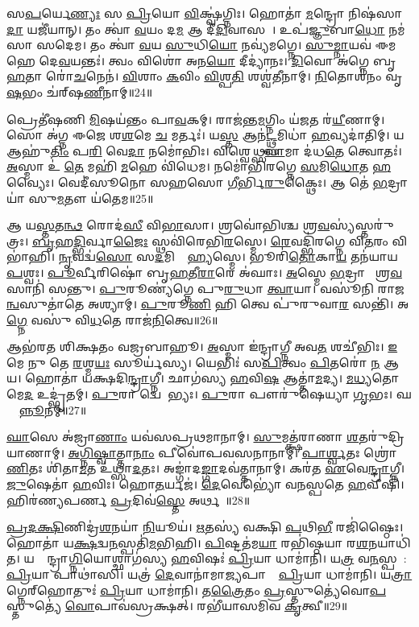 𑌸\ul{𑌪}𑌰𑍍𑌯𑍇\ul{𑌣𑍍𑌯𑌃} 𑌸 \ul{𑌪𑍍𑌰𑌿}𑌯𑍋 \ul{𑌵𑌿}𑌕𑍍𑌷𑍍𑌵॑𑌗𑍍𑌨𑌿𑌃।
𑌹𑍋𑌤𑌾॑ \ul{𑌮}𑌨𑍍𑌦𑍍𑌰𑍋 𑌨𑌿𑌷॑𑌸𑌾\ul{𑌦𑌾} 𑌯𑌜𑍀॑𑌯𑌾𑌨𑍍।
𑌤𑌂 𑌤𑍍𑌵𑌾॑ \ul{𑌵}𑌯𑌂 𑌦\ul{𑌮} 𑌆 𑌦𑍀॑\ul{𑌦𑌿}𑌵𑌾𑌸𑌮𑍍᳚।
𑌉𑌪॑\ul{𑌜𑍍𑌞𑍁}𑌬𑌾\ul{𑌧𑍋} 𑌨𑌮॑𑌸𑌾 𑌸𑌦𑍇𑌮।
𑌤𑌂 𑌤𑍍𑌵𑌾॑ \ul{𑌵}𑌯 \ul{𑌸𑍁}𑌧𑌿\ul{𑌯𑍋} 𑌨𑌵𑍍𑌯॑𑌮𑌗𑍍𑌨𑍇।
\ul{𑌸𑍁}\ul{𑌮𑍍𑌨𑌾}𑌯𑌵॑ 𑌈𑌮𑌹𑍇 𑌦𑍇\ul{𑌵}𑌯𑌨𑍍𑌤𑌃॑।
𑌤𑍍𑌵𑌂 𑌵𑌿𑌶𑍋॑ 𑌅𑌨\ul{𑌯𑍋} 𑌦𑍀𑌦𑍍𑌯𑌾॑𑌨𑌃।
\ul{𑌦𑌿}𑌵𑍋 𑌅॑𑌗𑍍𑌨𑍇 𑌬𑍃\ul{𑌹}𑌤𑌾 𑌰𑍋॑\ul{𑌚}𑌨𑍇𑌨॑।
\ul{𑌵𑌿}𑌶𑌾𑌂 \ul{𑌕}𑌵𑌿𑌂 \ul{𑌵𑌿}𑌶𑍍𑌪\ul{𑌤𑌿}\ul{} 𑌶𑌶𑍍𑌵॑𑌤𑍀𑌨𑌾𑌮𑍍।
\ul{𑌨𑌿}𑌤𑍋𑌶॑𑌨𑌂 𑌵𑍃\ul{𑌷}𑌭𑌂 𑌚॑𑌰𑍍‌\mbox{}𑌷\ul{𑌣𑍀}𑌨𑌾𑌮𑍍॥24॥

𑌪𑍍𑌰𑍇𑌤𑍀॑𑌷𑌣𑌿 \ul{𑌮𑌿}𑌷𑌯॑𑌨𑍍𑌤𑌂 𑌪𑌾\ul{𑌵}𑌕𑌮𑍍।
𑌰𑌾𑌜॑𑌨𑍍𑌤\ul{𑌮}𑌗𑍍𑌨𑌿𑌂 𑌯॑\ul{𑌜}𑌤 𑌰॑\ul{𑌯𑍀}𑌣𑌾𑌮𑍍।
𑌸𑍋 𑌅॑𑌗𑍍𑌨 𑌈𑌜𑍇 𑌶\ul{𑌶}𑌮𑍇 \ul{𑌚} 𑌮𑌰𑍍𑌤𑌃॑।
𑌯\ul{𑌸𑍍𑌤} 𑌆𑌨॑\ul{𑌟𑍍𑌥𑍍𑌸}𑌮𑌿𑌧𑌾॑ \ul{𑌹}𑌵𑍍𑌯𑌦𑌾॑𑌤𑌿𑌮𑍍।
𑌯 𑌆𑌹𑍁॑\ul{𑌤𑌿𑌂} 𑌪\ul{𑌰𑌿} 𑌵𑍇\ul{𑌦𑌾} 𑌨𑌮𑍋॑𑌭𑌿𑌃।
𑌵𑌿𑌶𑍍𑌵𑍇𑌥𑍍𑌸\ul{𑌵𑌾}𑌮𑌾 𑌦॑𑌧\ul{𑌤𑍇} 𑌤𑍍𑌵𑍋𑌤𑌃॑।
\ul{𑌅}𑌸𑍍𑌮𑌾 𑌉॑ \ul{𑌤𑍇} 𑌮𑌹𑌿॑ \ul{𑌮}𑌹𑍇 𑌵𑌿॑𑌧𑍇𑌮।
𑌨𑌮𑍋॑𑌭𑌿𑌰𑌗𑍍𑌨𑍇 \ul{𑌸}𑌮𑌿\ul{𑌧𑍋}𑌤 \ul{𑌹}𑌵𑍍𑌯𑍈𑌃।
𑌵𑍇𑌦𑍀॑𑌸𑍂𑌨𑍋 𑌸𑌹𑌸𑍋 \ul{𑌗𑍀}𑌰𑍍𑌭𑌿\ul{𑌰𑍁}𑌕𑍍𑌥𑍈𑌃।
𑌆 𑌤𑍇॑ \ul{𑌭}𑌦𑍍𑌰𑌾𑌯𑌾॑ 𑌸𑍁\ul{𑌮}𑌤𑍗 𑌯॑𑌤𑍇𑌮॥25॥

𑌆 𑌯\ul{𑌸𑍍𑌤}𑌤\ul{𑌨𑍍𑌥} 𑌰𑍋𑌦॑\ul{𑌸𑍀} 𑌵𑌿\ul{𑌭𑌾}𑌸𑌾।
𑌶𑍍𑌰𑌵𑍋॑𑌭𑌿𑌶𑍍𑌚 𑌶𑍍𑌰\ul{𑌵}𑌸𑍍𑌯॑𑌸𑍍𑌤𑌰𑍁॑𑌤𑍍𑌰𑌃।
\ul{𑌬𑍃}𑌹\ul{𑌦𑍍𑌭𑌿}𑌰𑍍𑌵𑌾\ul{𑌜𑍈𑌃} 𑌸𑍍𑌥𑌵𑌿॑𑌰𑍇𑌭𑌿\ul{𑌰}𑌸𑍍𑌮𑍇।
\ul{𑌰𑍇}𑌵𑌦𑍍𑌭𑌿॑𑌰𑌗𑍍𑌨𑍇 𑌵𑌿\ul{𑌤}𑌰𑌂 𑌵𑌿 𑌭𑌾॑𑌹𑌿।
\ul{𑌨𑍃}𑌵𑌦𑍍𑌵॑\ul{𑌸𑍋} 𑌸\ul{𑌦}𑌮𑌿𑌦𑍍𑌧𑍇᳚\ul{𑌹𑍍𑌯}𑌸𑍍𑌮𑍇।
𑌭𑍂𑌰𑌿॑\ul{𑌤𑍋}𑌕𑌾\ul{𑌯} 𑌤𑌨॑𑌯𑌾𑌯 \ul{𑌪}𑌶𑍍𑌵𑌃।
\ul{𑌪𑍂}𑌰𑍍𑌵𑍀𑌰𑌿𑌷𑍋॑ 𑌬𑍃\ul{𑌹}𑌤𑍀\ul{𑌰𑌾}𑌰𑍇 𑌅॑𑌘𑌾𑌃।
\ul{𑌅}𑌸𑍍𑌮𑍇 \ul{𑌭}𑌦𑍍𑌰𑌾 𑌸𑍗᳚𑌶𑍍𑌰\ul{𑌵}𑌸𑌾𑌨𑌿॑ 𑌸𑌨𑍍𑌤𑍁।
\ul{𑌪𑍁}𑌰𑍂𑌣𑍍𑌯॑𑌗𑍍𑌨𑍇 𑌪𑍁\ul{𑌰𑍁}𑌧𑌾 \ul{𑌤𑍍𑌵𑌾}𑌯𑌾।
𑌵𑌸𑍂॑𑌨𑌿 𑌰𑌾𑌜\ul{𑌨𑍍𑌵}𑌸𑍁𑌤𑌾॑𑌤𑍇 𑌅𑌶𑍍𑌯𑌾𑌮𑍍।
\ul{𑌪𑍁}𑌰𑍂\ul{𑌣𑌿} 𑌹𑌿 𑌤𑍍𑌵𑍇 𑌪𑍁॑𑌰𑍁𑌵𑌾\ul{𑌰} 𑌸𑌨𑍍𑌤𑌿॑।
𑌅\ul{𑌗𑍍𑌨𑍇} 𑌵𑌸𑍁॑ 𑌵𑌿\ul{𑌧}𑌤𑍇 𑌰𑌾𑌜॑\ul{𑌨𑌿}𑌤𑍍𑌵𑍇॥26॥

𑌆𑌭॑𑌰𑌤 𑌶𑌿𑌕𑍍𑌷𑌤𑌂 𑌵𑌜𑍍𑌰𑌬𑌾𑌹𑍂।
\ul{𑌅}𑌸𑍍𑌮𑌾 𑌇॑𑌨𑍍𑌦𑍍𑌰𑌾𑌗𑍍𑌨𑍀 𑌅𑌵\ul{𑌤}\ul{} 𑌶𑌚𑍀॑𑌭𑌿𑌃।
\ul{𑌇}𑌮𑍇 𑌨𑍁 𑌤𑍇 \ul{𑌰}𑌶𑍍𑌮\ul{𑌯𑌃} 𑌸𑍂𑌰𑍍𑌯॑𑌸𑍍𑌯।
𑌯𑍇𑌭𑌿𑌃॑ 𑌸\ul{𑌪𑌿}𑌤𑍍𑌵𑌂 \ul{𑌪𑌿}𑌤𑌰𑍋॑ \ul{𑌨} 𑌆𑌯\sn{}।
𑌹𑍋𑌤𑌾॑ 𑌯𑌕𑍍𑌷𑌦𑌿\ul{𑌨𑍍𑌦𑍍𑌰𑌾}𑌗𑍍𑌨𑍀।
𑌛𑌾𑌗॑𑌸𑍍𑌯 \ul{𑌹}𑌵𑌿\ul{𑌷} 𑌆𑌤𑍍𑌤𑌾॑\ul{𑌮}𑌦𑍍𑌯।
\ul{𑌮}\ul{𑌧𑍍𑌯}𑌤𑍋 𑌮𑍇\ul{𑌦} 𑌉𑌦𑍍𑌭𑍃॑𑌤𑌮𑍍।
\ul{𑌪𑍁}𑌰𑌾 𑌦𑍍𑌵𑍇𑌷𑍋᳚𑌭𑍍𑌯𑌃।
\ul{𑌪𑍁}𑌰𑌾 𑌪𑍗𑌰𑍁॑𑌷𑍇𑌯𑍍𑌯𑌾 \ul{𑌗𑍃}𑌭𑌃।
𑌘𑌸𑍍𑌤𑌾᳚\ul{𑌨𑍍𑌨𑍂}𑌨𑌮𑍍॥27॥

\ul{𑌘𑌾}𑌸𑍇 𑌅॑𑌜𑍍𑌰𑌾\ul{𑌣𑌾𑌂} 𑌯𑌵॑𑌸𑌪𑍍𑌰𑌥𑌮𑌾𑌨𑌾𑌮𑍍।
\ul{𑌸𑍁}𑌮𑌤𑍍𑌕𑍍𑌷॑𑌰𑌾𑌣𑌾 \ul{𑌶}𑌤𑌰𑍁॑𑌦𑍍𑌰𑌿𑌯𑌾𑌣𑌾𑌮𑍍।
\ul{𑌅}\ul{𑌗𑍍𑌨𑌿}\ul{𑌷𑍍𑌵𑌾}𑌤𑍍𑌤𑌾\ul{𑌨𑌾𑌂} 𑌪𑍀𑌵𑍋॑𑌪𑌵𑌸𑌨𑌾𑌨𑌾𑌮𑍍।
\ul{𑌪𑌾}\ul{𑌰𑍍𑌶𑍍𑌵}𑌤𑌃 𑌶𑍍𑌰𑍋॑\ul{𑌣𑌿}𑌤𑌃 𑌶𑌿॑𑌤𑌾\ul{𑌮}𑌤 𑌉॑𑌥𑍍𑌸𑌾\ul{𑌦}𑌤𑌃।
𑌅𑌙𑍍𑌗𑌾॑𑌦\ul{𑌙𑍍𑌗𑌾}𑌦𑌵॑𑌤𑍍𑌤𑌾𑌨𑌾𑌮𑍍।
𑌕𑌰॑𑌤 \ul{𑌏}𑌵𑍇\ul{𑌨𑍍𑌦𑍍𑌰𑌾}𑌗𑍍𑌨𑍀।
\ul{𑌜𑍁}𑌷𑍇𑌤𑌾॑ \ul{𑌹}𑌵𑌿𑌃।
𑌹𑍋\ul{𑌤}𑌰𑍍𑌯𑌜॑।
\ul{𑌦𑍇}𑌵𑍇𑌭𑍍𑌯𑍋॑ 𑌵𑌨𑌸𑍍𑌪𑌤𑍇 \ul{𑌹}𑌵𑍀𑌷𑌿॑।
𑌹𑌿𑌰॑𑌣𑍍𑌯𑌪𑌰𑍍𑌣 \ul{𑌪𑍍𑌰}𑌦𑌿𑌵॑\ul{𑌸𑍍𑌤𑍇} 𑌅𑌰𑍍𑌥𑌮𑍍᳚॥28॥

\ul{𑌪𑍍𑌰}\ul{𑌦}\ul{𑌕𑍍𑌷𑌿}𑌣𑌿𑌦𑍍𑌰॑\ul{𑌶}𑌨𑌯𑌾॑ \ul{𑌨𑌿}𑌯𑍂𑌯॑।
\ul{𑌋}𑌤𑌸𑍍𑌯॑ 𑌵𑌕𑍍𑌷𑌿 \ul{𑌪}𑌥𑌿\ul{𑌭𑍀} 𑌰𑌜𑌿॑𑌷𑍍𑌠𑍈𑌃।
𑌹𑍋𑌤𑌾॑ 𑌯\ul{𑌕𑍍𑌷}𑌦𑍍𑌵\ul{𑌨}𑌸𑍍𑌪𑌤𑌿॑\ul{𑌮}𑌭𑌿𑌹𑌿।
\ul{𑌪𑌿}𑌷𑍍𑌟𑌤॑𑌮\ul{𑌯𑌾} 𑌰𑌭𑌿॑𑌷𑍍𑌠𑌯𑌾 𑌰\ul{𑌶}𑌨𑌯𑌾𑌧𑌿॑𑌤।
𑌯𑌤𑍍𑌰𑍇᳚𑌨𑍍𑌦𑍍𑌰𑌾\ul{𑌗𑍍𑌨𑌿}𑌯𑍋𑌶𑍍𑌛𑌾𑌗॑𑌸𑍍𑌯 \ul{𑌹}𑌵𑌿𑌷𑌃॑ \ul{𑌪𑍍𑌰𑌿}𑌯𑌾 𑌧𑌾𑌮𑌾॑𑌨𑌿।
𑌯\ul{𑌤𑍍𑌰} 𑌵\ul{𑌨}𑌸𑍍𑌪𑌤𑍇᳚: \ul{𑌪𑍍𑌰𑌿}𑌯𑌾 𑌪𑌾𑌥𑌾॑𑌸𑌿।
𑌯𑌤𑍍𑌰॑ \ul{𑌦𑍇}𑌵𑌾𑌨𑌾॑𑌮𑌾\ul{𑌜𑍍𑌯}𑌪𑌾𑌨𑌾𑌂᳚ \ul{𑌪𑍍𑌰𑌿}𑌯𑌾 𑌧𑌾𑌮𑌾॑𑌨𑌿।
𑌯\ul{𑌤𑍍𑌰𑌾}𑌗𑍍𑌨𑍇𑌰𑍍‌\mbox{}𑌹𑍋𑌤𑍁𑌃॑ \ul{𑌪𑍍𑌰𑌿}𑌯𑌾 𑌧𑌾𑌮𑌾॑𑌨𑌿।
𑌤\ul{𑌤𑍍𑌰𑍈}𑌤𑌂 \ul{𑌪𑍍𑌰}𑌸𑍍𑌤𑍁𑌤𑍍𑌯𑍇॑𑌵𑍋\ul{𑌪}𑌸𑍍𑌤𑍁𑌤𑍍𑌯𑍇॑ \ul{𑌵𑍋}𑌪𑌾𑌵॑𑌸𑍍𑌰𑌕𑍍𑌷𑌤𑍍।
𑌰𑌭𑍀॑𑌯𑌾𑌸𑌮𑌿𑌵 \ul{𑌕𑍃}𑌤𑍍𑌵𑍀॥29॥


